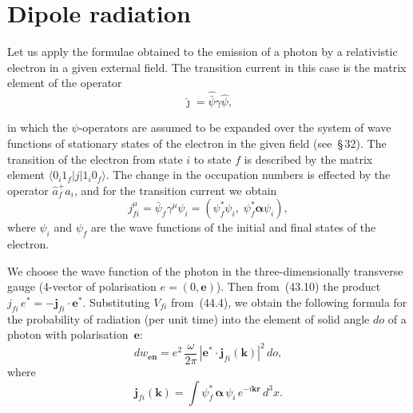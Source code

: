 \section{Dipole radiation}

Let us apply the formulae obtained to the emission of a photon by a relativistic electron in a given external field. The transition current in this case is the matrix element of the operator
\[
\widehat\jmath = \widehat{\bar\psi}\gamma\widehat\psi,
\]

in which the $\psi$-operators are assumed to be expanded over the system of wave functions of stationary states of the electron in the given field (see~\S\,32). The transition of the electron from state $i$ to state $f$ is described by the matrix element $\langle 0_i1_f|j|1_i0_f\rangle$. The change in the occupation numbers is effected by the operator $\widehat a^+_f\widehat a_i$, and for the transition current we obtain
\begin{equation}
j^\mu_{fi} = \bar\psi_f\gamma^\mu\psi_i = (\psi^*_f\psi_i,\;\psi^*_f\boldsymbol{\alpha}\psi_i),
\tag{45.1}
\end{equation}
where $\psi_i$ and $\psi_f$ are the wave functions of the initial and final states of the electron.

We choose the wave function of the photon in the three-dimensionally transverse gauge (4-vector of polarisation $e = (0,\mathbf{e})$). Then from~(43.10) the product $j_{fi}\,e^* = -\mathbf{j}_{fi}\cdot\mathbf{e}^*$. Substituting $V_{fi}$ from~(44.4), we obtain the following formula for the probability of radiation (per unit time) into the element of solid angle $do$ of a photon with polarisation~$\mathbf{e}$:
\begin{equation}
dw_{\mathbf{en}} = e^2\,\frac{\omega}{2\pi}\,|\mathbf{e}^*\cdot\mathbf{j}_{fi}(\mathbf{k})|^2\,do,
\tag{45.2}
\end{equation}
where
\begin{equation}
\mathbf{j}_{fi}(\mathbf{k}) = \int\psi^*_f\,\boldsymbol{\alpha}\,\psi_i\,e^{-i\mathbf{k}\mathbf{r}}\,d^3x.
\tag{45.3}
\end{equation}

